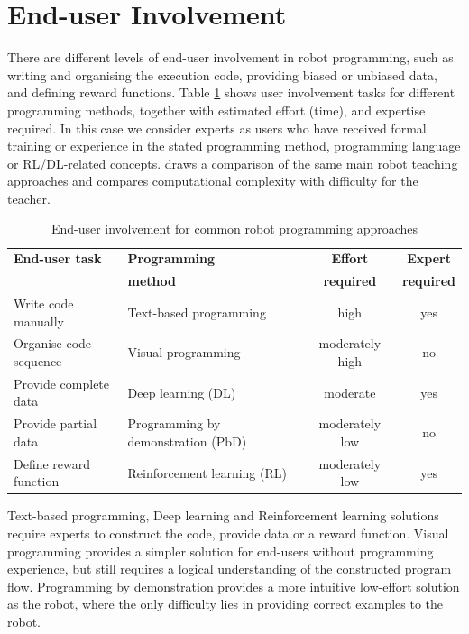 \section{End-user Involvement}\label{sssec:End-User Involvement}
There are different levels of end-user involvement in robot programming, such as writing and organising the execution code, providing biased or unbiased data, and defining reward functions. 
Table \ref{tab:enduserinvolvement} shows user involvement tasks for different programming methods, together with estimated effort (\eg time), and expertise required.
In this case we consider experts as users who have received formal training or experience in the stated programming method, \eg programming language or RL/DL-related concepts.
\cite{kormushev2013reinforcement} draws a comparison of the same main robot teaching approaches and compares computational complexity with difficulty for the teacher.

\begin{table}[ht]
	\centering
	\label{tab:enduserinvolvement}
	\begin{tabular}{llcc}
		\textbf{End-user task} & \textbf{Programming}   & \textbf{Effort} & \textbf{Expert} \\
		\textbf{}& \textbf{method}   & \textbf{ required} & \textbf{ required} \\ \hline
		Write code manually    & Text-based programming       & high                          & yes                      \\
		Organise code sequence & Visual programming           & moderately high               & no                       \\
		Provide complete data  & Deep learning (DL)               & moderate                      & yes                      \\
		Provide partial data   & Programming by demonstration (PbD) & moderately low                & no                       \\
		Define reward function & Reinforcement learning (RL)      & moderately low                & yes                     
	\end{tabular}
\caption{End-user involvement for common robot programming approaches}
\end{table}

Text-based programming, Deep learning and Reinforcement learning solutions require experts to construct the code, provide data or a reward function. Visual programming provides a simpler solution for end-users without programming experience, but still requires a logical understanding of the constructed program flow. Programming by demonstration provides a more intuitive low-effort solution as the robot, where the only difficulty lies in providing correct examples to the robot.


